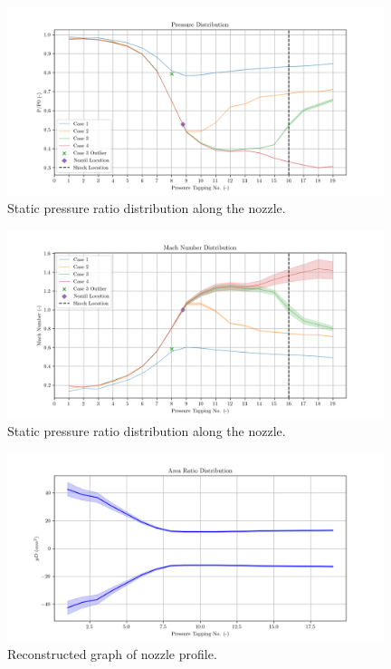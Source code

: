 \documentclass{article}
\begin{document}
\begin{figure}[H]
    \centering
    \includegraphics[width=0.98\textwidth]{../Supersonic_Nozzle/pressure_ratio_distribution_corrected.png}
    \caption{Static pressure ratio distribution along the nozzle.}
    \label{fig:pressure_distribution}
\end{figure}

\begin{figure}[H]
    \centering
    \includegraphics[width=0.98\textwidth]{../Supersonic_Nozzle/mach_number_distribution_corrected.png}
    \caption{Static pressure ratio distribution along the nozzle.}
    \label{fig:mach_distribution}
\end{figure}

\begin{figure}[H]
    \centering
    \includegraphics[width=0.98\textwidth]{../Supersonic_Nozzle/area_ratio_distribution.png}
    \caption{Reconstructed graph of nozzle profile.}
    \label{fig:area_distribution}
\end{figure}
\end{document}
